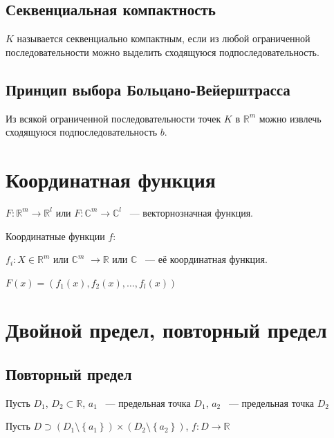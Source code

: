 \documentclass{article}
\begin{document}
        \subsection{Секвенциальная компактность}
            
            $K$ называется секвенциально компактным, если из любой ограниченной последовательности можно выделить сходящуюся подпоследовательность.
        
        \subsection{Принцип выбора Больцано-Вейерштрасса}
        
            Из всякой ограниченной последовательности точек $K$ в $\mathbb{R}^m$ можно извлечь сходящуюся подпоследовательность $b$.
            
    \newpage
    
    \section{Координатная функция}
    
        $F : \mathbb{R}^m \rightarrow \mathbb{R}^l$ или $F : \mathbb{C}^m \rightarrow \mathbb{C}^l$ ~--- векторнозначная функция.
        
        Координатные функции $f$:
        
        $f_i : X \in \mathbb{R}^m$ или $\mathbb{C}^m$ $\rightarrow \mathbb{R}$ или $\mathbb{C}$ ~--- её координатная функция.
        
        $F(x) = (f_1(x), f_2(x), \ldots, f_l(x))$
        
    \newpage
    
    \section{Двойной предел, повторный предел}
    
        \subsection{Повторный предел}
        
            Пусть $D_1$, $D_2 \subset \mathbb{R}$, $a_1$ ~--- предельная точка $D_1$, $a_2$ ~--- предельная точка $D_2$
        
            Пусть $D \supset \left(D_1 \setminus \left\{ a_1 \right\} \right) \times \left( D_2 \setminus \left\{ a_2 \right\} \right)$, $f : D \rightarrow \mathbb{R}$
        
\end{document}
